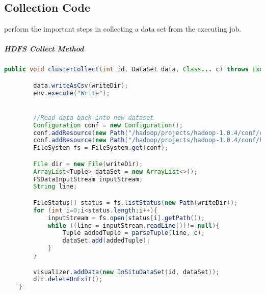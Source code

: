 \chapter{}

\section{Collection Code}
\label{app:collection}
 perform the important steps in collecting a data set from the executing job.

\paragraph{HDFS Collect Method}
\begin{lstlisting}[language=Java,showspaces=false,showstringspaces=false,breaklines=true, breakatwhitespace=true]
    public void clusterCollect(int id, DataSet data, Class... c) throws Exception{

        data.writeAsCsv(writeDir);
        env.execute("Write");


        //Read data back into new dataset
        Configuration conf = new Configuration();
        conf.addResource(new Path("/hadoop/projects/hadoop-1.0.4/conf/core-site.xml"));
        conf.addResource(new Path("/hadoop/projects/hadoop-1.0.4/conf/hdfs-site.xml"));
        FileSystem fs = FileSystem.get(conf);

        File dir = new File(writeDir);
        ArrayList<Tuple> dataSet = new ArrayList<>();
        FSDataInputStream inputStream;
        String line;

        FileStatus[] status = fs.listStatus(new Path(writeDir));
        for (int i=0;i<status.length;i++){
            inputStream = fs.open(status[i].getPath());
            while ((line = inputStream.readLine())!= null){
                Tuple addedTuple = parseTuple(line, c);
                dataSet.add(addedTuple);
            }
        }

        visualizer.addData(new InSituDataSet(id, dataSet));
        dir.deleteOnExit();
    }

\end{lstlisting}
\newpage

